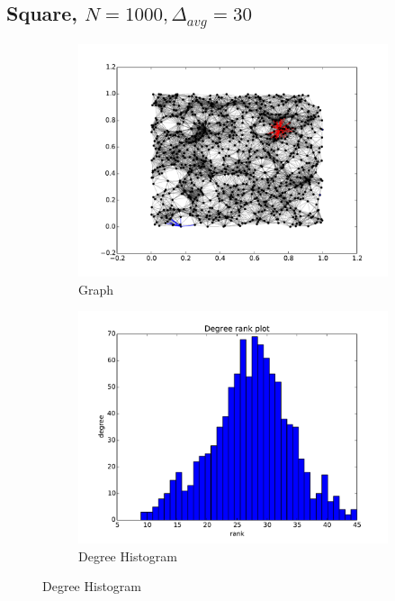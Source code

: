 \documentclass[oneside, titlepage]{scrartcl}
\begin{document}
\subsection{Square, $N=1000, \Delta_{avg}=30$}
\begin{figure}[!h]
\centering
\begin{subfigure}{0.5\textwidth}
	\centering
	\includegraphics[width=0.9\linewidth]{figures/graph1.pdf}
	\caption{Graph}
\end{subfigure}%
\begin{subfigure}{0.5\textwidth}
	\centering
	\includegraphics[width=0.9\linewidth]{figures/degrees1.pdf}
	\caption{Degree Histogram}
\end{subfigure}


\end{figure}
\end{document}

